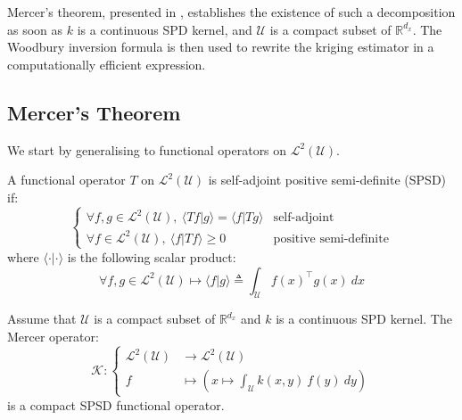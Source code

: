 Mercer's theorem, presented in , establishes the existence of such a decomposition as soon as $k$ is a continuous SPD kernel, and $\mathcal{U}$ is a compact subset of $\mathbb{R}^{d_x}$. The Woodbury inversion formula is then used to rewrite the kriging estimator in a computationally efficient expression.

\subsection{Mercer's Theorem}

We start by generalising  to functional operators on $\mathcal{L}^2(\mathcal{U})$.

\begin{definition}
	A functional operator $T$ on $\mathcal{L}^2(\mathcal{U})$ is self-adjoint positive semi-definite (SPSD) if:
	\begin{equation}
		\left\{\begin{array}{ll}
		\forall f,g\in\mathcal{L}^2(\mathcal{U}),\:\langle Tf|g\rangle=\langle f|Tg\rangle&\text{self-adjoint}\\
		\forall f\in\mathcal{L}^2(\mathcal{U}),\:\langle f|Tf\rangle\geq0&\text{positive semi-definite}
		\end{array}\right.
	\end{equation}
	where $\langle\cdot|\cdot\rangle$ is the following scalar product:
	\begin{equation}
		\forall f,g\in\mathcal{L}^2(\mathcal{U})\mapsto\langle f|g\rangle\triangleq\int_{\mathcal{U}}{f(x)^\top g(x)\:dx}
	\end{equation}
\end{definition}

\begin{proposition}\label{th:covariance_operator}
	Assume that $\mathcal{U}$ is a compact subset of $\mathbb{R}^{d_x}$ and $k$ is a continuous SPD kernel. The Mercer operator:
	\begin{equation}
		\mathcal{K}:\left\{\begin{aligned}
		\mathcal{L}^2(\mathcal{U})&\to\mathcal{L}^2(\mathcal{U})\\
		f&\mapsto\left(x\mapsto\int_{\mathcal{U}}{k(x,y)\:f(y)\:dy}\right)
		\end{aligned}\right.
	\end{equation}
	is a compact SPSD functional operator.
\end{proposition}


